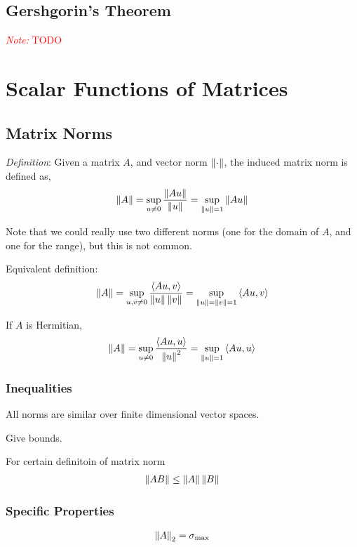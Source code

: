 \documentclass[12pt]{article}
\newcommand{\note}[1]{\textcolor{red}{\textit{Note:} #1}}
\begin{document}
\subsection{Gershgorin's Theorem}

\note{TODO}

\pagebreak

\section{Scalar Functions of Matrices}

\subsection{Matrix Norms}
\textit{Definition}: Given a matrix \( A \), and vector norm \( \left\lVert\cdot\right\rVert \), the induced matrix norm is defined as,
\begin{align*}
    \left\lVert A\right\rVert = \sup_{u\neq 0} \frac{\left\lVert Au\right\rVert}{\left\lVert u\right\rVert} = \sup_{\left\lVert u\right\rVert=1} \left\lVert Au\right\rVert
\end{align*}

Note that we could really use two different norms (one for the domain of \( A \), and one for the range), but this is not common.

Equivalent definition:
\begin{align*}
    \left\lVert A\right\rVert = \sup_{u,v\neq 0} \frac{\left\langle Au,v \right\rangle}{\left\lVert u\right\rVert\left\lVert v\right\rVert} = \sup_{\left\lVert u\right\rVert=\left\lVert v\right\rVert=1} \left\langle Au,v \right\rangle
\end{align*}
 
If \( A \) is Hermitian,
\begin{align*}
    \left\lVert A\right\rVert = \sup_{u\neq 0} \frac{\left\langle Au,u \right\rangle}{\left\lVert u\right\rVert^2} = \sup_{\left\lVert u\right\rVert=1} \left\langle Au,u \right\rangle
\end{align*}


\subsubsection{Inequalities}

All norms are similar over finite dimensional vector spaces.

Give bounds.

For certain definitoin of matrix norm
\begin{align*}
    \left\lVert A B\right\rVert \leq \left\lVert A\right\rVert\left\lVert B\right\rVert
\end{align*}


\subsubsection{Specific Properties}
\begin{align*}
    \left\lVert A\right\rVert_2 = \sigma_{\text{max}}
\end{align*}
\end{document}
